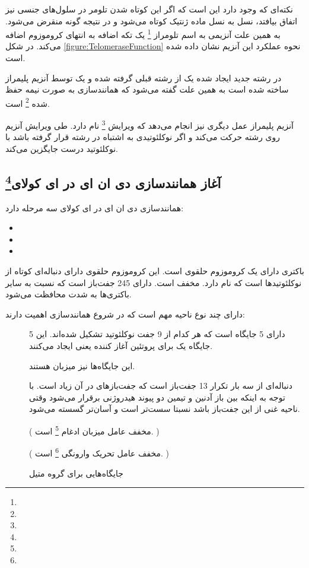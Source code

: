 نکته‌ای که وجود دارد این است که اگر این کوتاه شدن تلومر در سلول‌های جنسی نیز اتفاق بیافتد، نسل به نسل ماده ژنتیک کوتاه می‌شود و در نتیجه گونه منقرض می‌شود. به همین علت آنزیمی به اسم تلومراز
\footnote{}
یک تکه اضافه به انتهای کروموزوم اضافه می‌کند.
در شکل
\ref{figure:TelomeraseFunction}
نحوه عملکرد این آنزیم نشان داده شده است.

در رشته جدید ایجاد شده یک
از رشته قبلی گرفته شده و یک
توسط آنزیم 
پلیمراز ساخته شده است به همین علت گفته می‌شود که همانندسازی
به صورت نیمه حفظ شده
\footnote{}
 است.

آنزیم
پلیمراز عمل دیگری نیز انجام می‌دهد که ویرایش
\footnote{}
نام دارد. طی ویرایش آنزیم روی رشته حرکت می‌کند و اگر نوکلئوتیدی به اشتباه در رشته قرار گرفته باشد با نوکلئوتید درست جایگزین می‌کند.

\pagebreak
\subsection{آغاز همانندسازی دی ان ای در ای کولای\protect\footnote{}}

همانندسازی دی ان ای در ای کولای سه مرحله دارد:
\begin{itemize}
\item {}
\item {}
\item {}
\end{itemize}

باکتری
دارای یک کروموزوم حلقوی است. این کروموزوم حلقوی دارای دنباله‌ای کوتاه از نوکلئوتید‌ها است که
نام دارد.
مخفف
است.
دارای 245 جفت‌باز است که نسبت به سایر باکتری‌ها به شدت محافظت می‌شود.

دارای چند نوع ناحیه مهم است که در شروع همانند‌سازی اهمیت دارند:

\begin{description}
\item[]
دارای 5 جایگاه
است که هر کدام از 9 جفت نوکلئوتید تشکیل شده‌اند.  این 5 جایگاه یک
برای پروتئین آغاز کننده یعنی
ایجاد می‌کنند.
\item[]
این جایگاه‌ها نیز میزبان
هستند.
\item[]
دنباله‌ای از سه بار تکرار 13 جفت‌باز است که جفت‌باز‌های
در آن زیاد است. با توجه به اینکه بین باز آدنین و تیمین دو پیوند هیدروژنی برقرار می‌شود وقتی ناحیه غنی از این جفت‌باز باشد نسبتا سست‌تر است و آسان‌تر گسسته می‌شود.
\item[]
(
مخفف
عامل میزبان ادغام
\footnote{}
است.
)
\item[]
(
مخفف
عامل تحریک وارونگی
\footnote{}
است.
)
\item[]
جایگاه‌هایی برای گروه متیل
\end{description}

